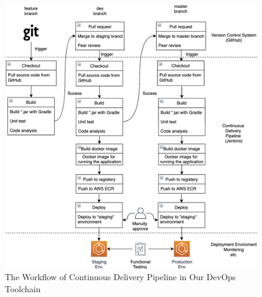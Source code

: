 \begin{figure}[h]
 \centering
 \includegraphics[width=0.99\textwidth]{pics/pipeline.png}
 \caption{The Workflow of Continuous Delivery Pipeline in Our DevOps Toolchain}
 \label{fig:pipeline}
\end{figure}
